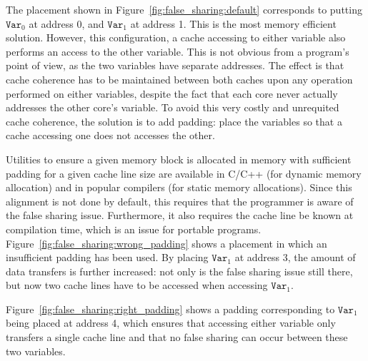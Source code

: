 The placement shown in Figure~\ref{fig:false_sharing:default} corresponds to
putting $\texttt{Var}_0$ at address 0, and $\texttt{Var}_1$ at address 1. This
is the most memory efficient solution. However, this configuration, a cache
accessing to either variable also performs an access to the other variable. This
is not obvious from a program's point of view, as the two variables have
separate addresses. The effect is that cache coherence has to be maintained
between both caches upon any operation performed on either variables, despite
the fact that each core never actually addresses the other core's variable. To
avoid this very costly and unrequited cache coherence, the solution is to add
padding: place the variables so that a cache accessing one does not accesses the
other.

Utilities to ensure a given memory block is allocated in memory with sufficient
padding for a given cache line size are available in C/C++ (for dynamic memory
allocation) and in popular compilers (for static memory allocations). Since this
alignment is not done by default, this requires that the programmer is aware of
the false sharing issue. Furthermore, it also requires the cache line be known
at compilation time, which is an issue for portable programs.
Figure~\ref{fig:false_sharing:wrong_padding} shows a placement in which an
insufficient padding has been used. By placing $\texttt{Var}_1$ at address 3,
the amount of data transfers is further increased: not only is the false sharing
issue still there, but now two cache lines have to be accessed when accessing
$\texttt{Var}_1$.

Figure~\ref{fig:false_sharing:right_padding} shows a padding corresponding to
$\texttt{Var}_1$ being placed at address 4, which ensures that accessing either
variable only transfers a single cache line and that no false sharing can occur
between these two variables.
